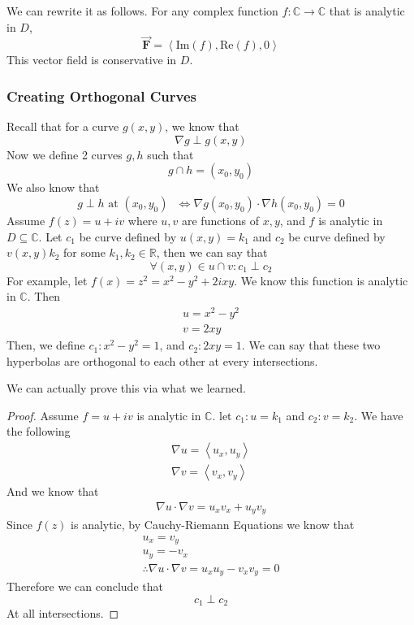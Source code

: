 \documentclass[12pt]{book}
\newcommand{\R}{\mathbb{R}}
\newcommand{\C}{\mathbb{C}}
\newcommand{\tribkt}[1]{\left< #1 \right>}
\begin{document}
We can rewrite it as follows. For any complex function $f \colon \C \to \C$ that is analytic in $D$,
\[
\Vec{\mathbf{F}} = \tribkt{\text{Im}(f),\text{Re}(f),0}
\]
This vector field is conservative in $D$. 

\subsubsection{Creating Orthogonal Curves}
Recall that for a curve $g(x,y)$, we know that 
\[
\nabla g \perp g(x,y)
\]
Now we define 2 curves $g,h$ such that 
\[
g\cap h = (x_0,y_0)
\]
We also know that
\[
g \perp h \text{ at $(x_0,y_0)$ } \iff \nabla g(x_0,y_0) \cdot \nabla h(x_0,y_0) = 0
\]
Assume $f(z) = u + iv$ where $u,v$ are functions of $x,y$, and $f$ is analytic in $D \subseteq \C$. Let $c_1$ be curve defined by $u(x,y)=k_1$ and $c_2$ be curve defined by $v(x,y)k_2$ for some $k_1,k_2 \in \R$, then we can say that
\[
\forall (x,y) \in u \cap v \colon  c_1 \perp c_2 
\]
For example, let $f(x) = z^2 = x^2 - y^2 + 2ixy$. We know this function is analytic in $\C$. Then
\begin{align*}
    u = x^2 - y^2\\
    v = 2xy
\end{align*}
Then, we define $c_1 \colon x^2-y^2 = 1$, and $c_2 \colon 2xy=1$. We can say that these two hyperbolas are orthogonal to each other at every intersections. 

We can actually prove this via what we learned.
\begin{proof}
    Assume $f = u+iv$ is analytic in $\C$. let $c_1 \colon u = k_1$ and $c_2 \colon v = k_2$. We have the following
    \begin{align*}
        \nabla u = \tribkt{u_x,u_y}\\
        \nabla v = \tribkt{v_x,v_y}
    \end{align*}
    And we know that
    \begin{align*}
        \nabla u \cdot \nabla v = u_xv_x + u_yv_y
    \end{align*}
    Since $f(z)$ is analytic, by Cauchy-Riemann Equations we know that
    \begin{align*}
        u_x = v_y\\
        u_y = -v_x\\
        \therefore \nabla u \cdot \nabla v = u_xu_y - v_xv_y = 0
    \end{align*}
    Therefore we can conclude that 
    \[
    c_1 \perp c_2
    \]
    At all intersections.
\end{proof}
\end{document}
